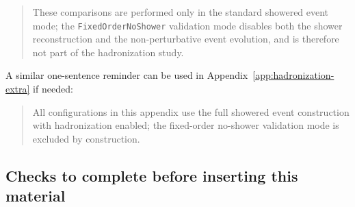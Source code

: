 \begin{quote}
\small
These comparisons are performed only in the standard showered event mode; the
\texttt{FixedOrderNoShower} validation mode disables both the shower
reconstruction and the non-perturbative event evolution, and is therefore not
part of the hadronization study.
\end{quote}

A similar one-sentence reminder can be used in
Appendix~\ref{app:hadronization-extra} if needed:

\begin{quote}
\small
All configurations in this appendix use the full showered event construction
with hadronization enabled; the fixed-order no-shower validation mode is
excluded by construction.
\end{quote}

\subsection*{Checks to complete before inserting this material}

